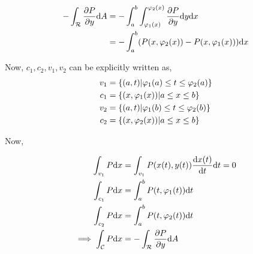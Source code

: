 \documentclass[../Analysis-3]{subfiles}
\begin{document}
\begin{align*}
    -\int_{\mathcal{R}} \pdv{P}{y} \dd A & = -\int_{a}^{b} \int_{\varphi_1(x)}^{\varphi_2(x)} \pdv{P}{y} \dd y \dd x \\
                                         & = - \int_{a}^{b} (P(x,\varphi_2(x))-P(x,\varphi_1(x))) \dd x              \\
\end{align*}

Now, $c_1,c_2,v_1,v_2$ can be explicitly written as,
\begin{align*}
    v_1 & = \qty{(a,t) | \varphi_1(a) \le t \le \varphi_2(a)} \\
    c_1 & = \qty{(x,\varphi_1(x)) | a \le x \le b}            \\
    v_2 & = \qty{(a,t) | \varphi_1(b) \le t \le \varphi_2(b)} \\
    c_2 & = \qty{(x,\varphi_2(x)) | a \le x \le b}
\end{align*}

Now,

\begin{align*}
    \int_{v_1} P \dd x                 & = \int_{v_1} P(x(t),y(t)) \dv{x(t)}{t} \dd t = 0 \\
    \int_{c_1} P \dd x                 & = \int_{a}^{b} P(t,\varphi_1(t)) \dd t           \\
    \int_{c_2} P \dd x                 & = \int_{a}^{b} P(t,\varphi_2(t)) \dd t           \\
    \implies \int_{\mathcal{C}} P\dd x & = -\int_{\mathcal{R}} \pdv{P}{y} \dd A
\end{align*}
\end{document}
